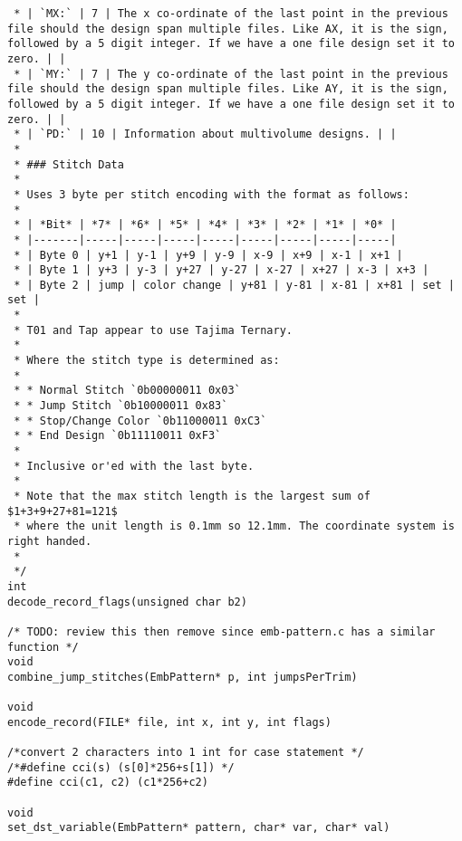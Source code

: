 \begin{lstlisting}
 * | `MX:` | 7 | The x co-ordinate of the last point in the previous file should the design span multiple files. Like AX, it is the sign, followed by a 5 digit integer. If we have a one file design set it to zero. | |
 * | `MY:` | 7 | The y co-ordinate of the last point in the previous file should the design span multiple files. Like AY, it is the sign, followed by a 5 digit integer. If we have a one file design set it to zero. | |
 * | `PD:` | 10 | Information about multivolume designs. | |
 *
 * ### Stitch Data
 *
 * Uses 3 byte per stitch encoding with the format as follows:
 *
 * | *Bit* | *7* | *6* | *5* | *4* | *3* | *2* | *1* | *0* |
 * |-------|-----|-----|-----|-----|-----|-----|-----|-----|
 * | Byte 0 | y+1 | y-1 | y+9 | y-9 | x-9 | x+9 | x-1 | x+1 |
 * | Byte 1 | y+3 | y-3 | y+27 | y-27 | x-27 | x+27 | x-3 | x+3 |
 * | Byte 2 | jump | color change | y+81 | y-81 | x-81 | x+81 | set | set |
 *
 * T01 and Tap appear to use Tajima Ternary.
 *
 * Where the stitch type is determined as:
 * 
 * * Normal Stitch `0b00000011 0x03`
 * * Jump Stitch `0b10000011 0x83`
 * * Stop/Change Color `0b11000011 0xC3`
 * * End Design `0b11110011 0xF3`
 *
 * Inclusive or'ed with the last byte.
 *
 * Note that the max stitch length is the largest sum of $1+3+9+27+81=121$
 * where the unit length is 0.1mm so 12.1mm. The coordinate system is right handed.
 *
 */
int
decode_record_flags(unsigned char b2)

/* TODO: review this then remove since emb-pattern.c has a similar function */
void
combine_jump_stitches(EmbPattern* p, int jumpsPerTrim)

void
encode_record(FILE* file, int x, int y, int flags)

/*convert 2 characters into 1 int for case statement */
/*#define cci(s) (s[0]*256+s[1]) */
#define cci(c1, c2) (c1*256+c2)

void
set_dst_variable(EmbPattern* pattern, char* var, char* val)


\end{lstlisting}
